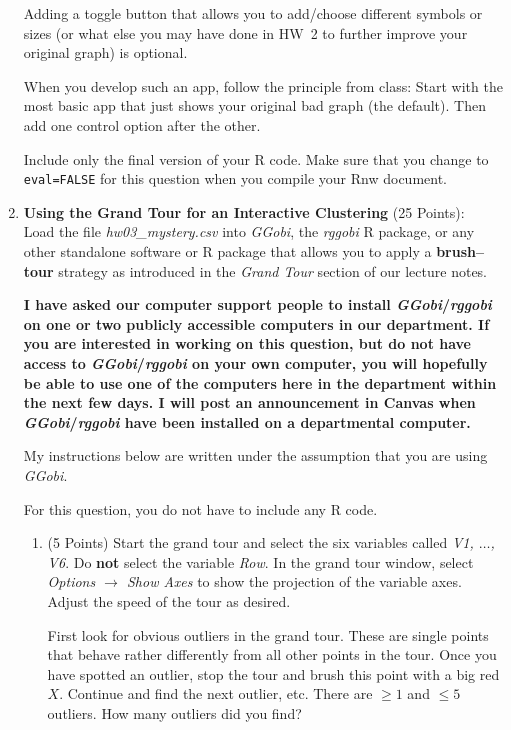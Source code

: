 \documentclass[12pt,letterpaper,final]{article}
\begin{document}
\begin{enumerate}
Adding a toggle button that allows you to add/choose different symbols
or sizes (or what else you may have done in HW~2 to further improve
your original graph) is optional.

When you develop such an app, follow the principle from class:
Start with the most basic app that just shows your original bad graph
(the default). Then add one control option after the other.

Include only the final version of your R code. Make sure
that you change to \verb|eval=FALSE| for this question
when you compile your Rnw document.


\newpage


\item {\bf Using the Grand Tour for an Interactive Clustering} (25 Points): \\
Load the file {\it hw03\_mystery.csv} into {\it GGobi}, the {\it rggobi} R package, or any other
standalone software or R package that allows you to apply a {\bf brush--tour} strategy
as introduced in the {\it Grand Tour} section of our lecture notes.

{\bf I have asked our computer support people
to install {\it GGobi}/{\it rggobi} on one or two publicly accessible computers in
our department. If you are interested in working on this question,
but do not have access to {\it GGobi}/{\it rggobi} on your own computer,
you will hopefully be able to use one of the computers here in
the department within the next few days. I will post an announcement in Canvas
when {\it GGobi}/{\it rggobi} have been installed on a 
departmental computer.}

My instructions below are written under the assumption that you are using {\it GGobi}.

For this question, you do not have to include any R code.


\begin{enumerate}

\item (5 Points)
Start the grand tour and select the six variables called {\it V1, $\ldots$, V6}.
Do {\bf not} select the variable {\it Row}. In the grand tour window,
select {\it Options $\rightarrow$ Show Axes} to show the projection of the
variable axes. Adjust the speed of the tour as desired. 

First look for obvious outliers
in the grand tour. These are single points that behave rather differently from all
other points in the tour. Once you have spotted an outlier, stop the tour
and brush this point with a big red $X$. Continue and find the next outlier, etc.
There are $\geq 1$ and $\leq 5$ outliers. How many outliers did you find?


\end{enumerate}
\end{enumerate}
\end{document}
